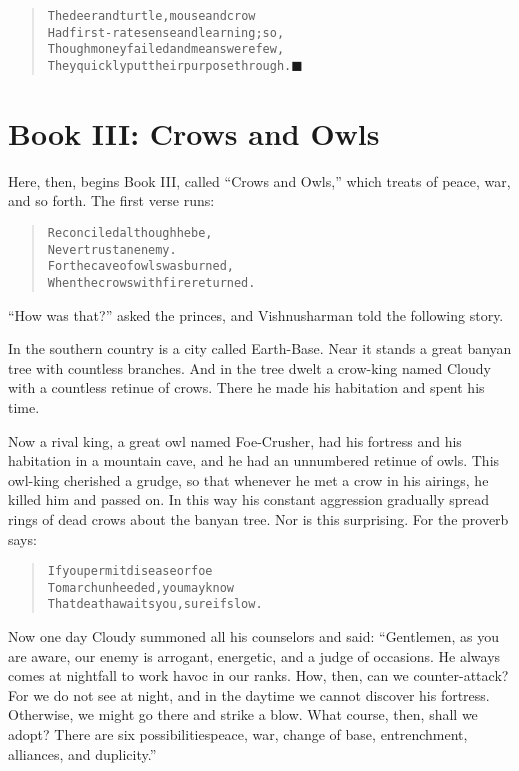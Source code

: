 \documentclass[article, twoside, 14pt]{memoir}
\newcommand{\qed}{\hfill \ensuremath{\blacksquare}}
\renewenvironment{verbatim}{%
\begin{quote}%
\vskip -10pt%
\begin{alltt}\normalfont\large}{\end{alltt}%
\end{quote}%
\vskip -10pt
} %
\begin{document}
\begin{verbatim}
The deer and turtle, mouse and crow
Had first-rate sense and learning; so,
Though money failed and means were few,
They quickly put their purpose through.\hyperref[s35]{\qed}
\end{verbatim}
\part{Book III: Crows and Owls}

\label{s46}

Here, then, begins Book III, called ``Crows and Owls,'' which
treats of peace, war, and so forth. The first verse runs:

\begin{verbatim}
Reconciled although he be,
Never trust an enemy.
For the cave of owls was burned,
When the crows with fire returned.
\end{verbatim}
``How was that?'' asked the princes, and Vishnusharman told the
following story.

In the southern country is a city called Earth-Base.
\label{s47}Near it stands a great banyan tree with countless
branches. And in the tree dwelt a crow-king named Cloudy with a
countless retinue of crows. There he made his habitation and spent
his time.

Now a rival king, a great owl named Foe-Crusher, had his fortress
and his habitation in a mountain cave, and he had an unnumbered
retinue of owls. This owl-king cherished a grudge, so that whenever
he met a crow in his airings, he killed him and passed on. In this
way his constant aggression gradually spread rings of dead crows
about the banyan tree. Nor is this surprising. For the proverb
says:

\begin{verbatim}
If you permit disease or foe
To march unheeded, you may know
That death awaits you, sure if slow.
\end{verbatim}
Now one day Cloudy summoned all his counselors and said:
``Gentlemen, as you are aware, our enemy is arrogant, energetic, and a judge of occasions. He always comes at nightfall to work havoc in our ranks. How, then, can we counter-attack? For we do not see at night, and in the daytime we cannot discover his fortress. Otherwise, we might go there and strike a blow. What course, then, shall we adopt? There are six possibilities{\textemdash}peace, war, change of base, entrenchment, alliances, and duplicity.''
\end{document}
